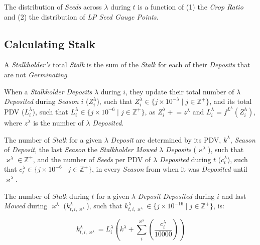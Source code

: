 \documentclass[tikz]{article}
\newcommand{\term}[1]{\textsl{#1}}
\begin{document}
The distribution of \term{Seeds} across $\lambda$ during $t$ is a function of (1) the \term{Crop Ratio} and (2) the distribution of \term{LP Seed Gauge Points}.


\vspace*{-1mm}
\subsection{Calculating Stalk}
\vspace*{-1mm}

A \term{Stalkholder's} total \term{Stalk} is the sum of the \term{Stalk} for each of their \term{Deposits} that are not \term{Germinating}.

When a \term{Stalkholder} \term{Deposits} $\lambda$ during $i$, they update their total number of $\lambda$ \term{Deposited} during \term{Season} $i$ ($Z_{i}^{\lambda}$), such that $Z_{i}^{\lambda} \in \{j \times 10^{-\lambda} \mid j \in \mathbb{Z}^{+} \}$,  and its total PDV ($L_{i}^{\lambda}$), such that $L_{i}^{\lambda} \in \{j \times 10^{-6} \mid j \in \mathbb{Z}^{+} \}$, as $Z_{i}^{\lambda} \mathrel{+}= z^{\lambda}$ and $L_{i}^{\lambda} \mathrel= f^{L^{\lambda}}(Z_{i}^{\lambda})$, where $z^{\lambda}$ is the number of $\lambda$ \term{Deposited}. 

The number of \term{Stalk} for a given $\lambda$ \term{Deposit} are determined by its PDV, $k^{\lambda}$,  \term{Season} of \term{Deposit}, the last \term{Season} the \term{Stalkholder} \term{Mowed} $\lambda$ \term{Deposits} ($\varkappa^{\lambda}$), such that $\varkappa^{\lambda} \in \mathbb{Z}^{+}$,  and the number of \term{Seeds} per PDV of $\lambda$ \term{Deposited} during $t$ ($c_{t}^{\lambda}$), such that $c_{t}^{\lambda} \in \{j \times 10^{-6} \mid j \in \mathbb{Z}^{+} \}$,  in every \term{Season} from when it was \term{Deposited} until $\varkappa^{\lambda}$.

The number of \term{Stalk} during $t$ for a given $\lambda$ \term{Deposit} \term{Deposited} during $i$ and last \term{Mowed} during $\varkappa^{\lambda}$ ({$k_{t,i,\varkappa^{\lambda}}^{\lambda}$}), such that $k_{t,i,\varkappa^{\lambda}}^{\lambda} \in \{j \times 10^{-16} \mid j \in \mathbb{Z}^{+} \}$, is:

    $$
        k_{t,i,\varkappa^{\lambda}}^{\lambda} = 
            L_{i}^{\lambda} \left( 
            k^{\lambda} + 
            \sum_{i}^{\varkappa^{\lambda}} \left
                (\frac{c_{i}^{\lambda}}
                        {10000}\right) 
            \right)
    $$
\end{document}
